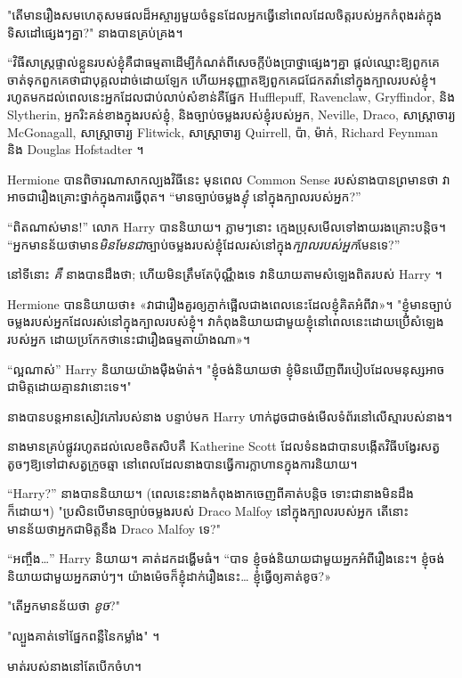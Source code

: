 {{{{{{"តើមានរឿងសមហេតុសមផលដ៏អស្ចារ្យមួយចំនួនដែលអ្នកធ្វើនៅពេលដែលចិត្តរបស់អ្នកកំពុងរត់ក្នុងទិសដៅផ្សេងៗគ្នា?" នាងបានគ្រប់គ្រង។

“វិធីសាស្រ្តផ្ទាល់ខ្លួនរបស់ខ្ញុំគឺជាធម្មតាដើម្បីកំណត់ពីសេចក្តីប៉ងប្រាថ្នាផ្សេងៗគ្នា ផ្តល់ឈ្មោះឱ្យពួកគេ ចាត់ទុកពួកគេថាជាបុគ្គលដាច់ដោយឡែក ហើយអនុញ្ញាតឱ្យពួកគេជជែកតវ៉ានៅក្នុងក្បាលរបស់ខ្ញុំ។ រហូតមកដល់ពេលនេះអ្នកដែលជាប់លាប់សំខាន់គឺផ្នែក Hufflepuff, Ravenclaw, Gryffindor, និង Slytherin, អ្នករិះគន់ខាងក្នុងរបស់ខ្ញុំ, និងច្បាប់ចម្លងរបស់ខ្ញុំរបស់អ្នក, Neville, Draco, សាស្រ្តាចារ្យ McGonagall, សាស្រ្តាចារ្យ Flitwick, សាស្រ្តាចារ្យ Quirrell, ប៉ា, ម៉ាក់, Richard Feynman និង Douglas Hofstadter ។

Hermione បានពិចារណាសាកល្បងវិធីនេះ មុនពេល Common Sense របស់នាងបានព្រមានថា វាអាចជារឿងគ្រោះថ្នាក់ក្នុងការធ្វើពុត។ “មានច្បាប់ចម្លង\emph{ខ្ញុំ} នៅក្នុងក្បាលរបស់អ្នក?”

“ពិតណាស់មាន!” លោក Harry បាននិយាយ។ ភ្លាមៗនោះ ក្មេងប្រុសមើលទៅងាយរងគ្រោះបន្តិច។ “អ្នកមានន័យថាមាន\emph{មិនមែនជា}ច្បាប់ចម្លងរបស់ខ្ញុំដែលរស់នៅក្នុង\emph{ក្បាលរបស់អ្នក}មែនទេ?”

នៅទីនោះ \emph{គឺ} នាងបានដឹងថា; ហើយមិនត្រឹមតែប៉ុណ្ណឹងទេ វានិយាយតាមសំឡេងពិតរបស់ Harry ។

Hermione បាន​និយាយ​ថា​៖ «វា​ជា​រឿង​គួរ​ឲ្យ​ភ្ញាក់​ផ្អើល​ជាង​ពេល​នេះ​ដែល​ខ្ញុំ​គិត​អំពី​វា»។ "ខ្ញុំមានច្បាប់ចម្លងរបស់អ្នកដែលរស់នៅក្នុងក្បាលរបស់ខ្ញុំ។ វា​កំពុង​និយាយ​ជាមួយ​ខ្ញុំ​នៅ​ពេល​នេះ​ដោយ​ប្រើ​សំឡេង​របស់​អ្នក ដោយ​ប្រកែក​ថា​នេះ​ជា​រឿង​ធម្មតា​យ៉ាង​ណា​»។

“ល្អណាស់” Harry និយាយយ៉ាងម៉ឺងម៉ាត់។ "ខ្ញុំចង់និយាយថា ខ្ញុំមិនឃើញពីរបៀបដែលមនុស្សអាចជាមិត្តដោយគ្មានវានោះទេ។"

នាងបានបន្តអានសៀវភៅរបស់នាង បន្ទាប់មក Harry ហាក់ដូចជាចង់មើលទំព័រនៅលើស្មារបស់នាង។

នាង​មាន​គ្រប់​ផ្លូវ​រហូត​ដល់​លេខ​ចិតសិប​គឺ Katherine Scott ដែល​ទំនង​ជា​បាន​បង្កើត​វិធី​បង្វែរ​សត្វ​តូចៗ​ឱ្យ​ទៅ​ជា​សត្វ​ក្រូច​ឆ្មា នៅ​ពេល​ដែល​នាង​បាន​ធ្វើ​ការ​ក្លាហាន​ក្នុង​ការ​និយាយ។

“Harry?” នាងបាននិយាយ។ (ពេលនេះនាងកំពុងងាកចេញពីគាត់បន្តិច ទោះជានាងមិនដឹងក៏ដោយ។) "ប្រសិនបើមានច្បាប់ចម្លងរបស់ Draco Malfoy នៅក្នុងក្បាលរបស់អ្នក តើនោះមានន័យថាអ្នកជាមិត្តនឹង Draco Malfoy ទេ?"

“អញ្ចឹង…” Harry និយាយ។ គាត់ដកដង្ហើមធំ។ “បាទ ខ្ញុំចង់និយាយជាមួយអ្នកអំពីរឿងនេះ។ ខ្ញុំចង់និយាយជាមួយអ្នកឆាប់ៗ។ យ៉ាង​ម៉េច​ក៏​ខ្ញុំ​ដាក់​រឿង​នេះ… ខ្ញុំ​ធ្វើ​ឲ្យ​គាត់​ខូច?»

"តើអ្នកមានន័យថា \emph{ខូច}?"

"ល្បួងគាត់ទៅផ្នែកពន្លឺនៃកម្លាំង" ។

មាត់របស់នាងនៅតែបើកចំហ។

}}}}}}
